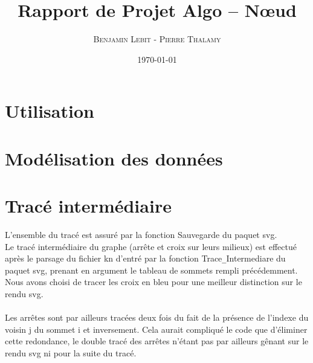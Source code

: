 \documentclass{article}
\title{Rapport de Projet Algo -- Nœud}
\author{\textsc{Benjamin Lebit} - \textsc{Pierre Thalamy}}
\date{\today}
\begin{document}
\maketitle

\section {Utilisation}

\section {Modélisation des données}

\section {Tracé intermédiaire}
L'ensemble du tracé est assuré par la fonction Sauvegarde du paquet svg.
\\
Le tracé intermédiaire du graphe (arrête et croix sur leurs milieux) est effectué après le parsage du fichier kn d'entré par la fonction
Trace\verb+_+Intermediare du paquet svg, prenant en argument le tableau de sommets rempli précédemment. Nous avons choisi de tracer les croix en bleu pour une meilleur distinction sur le rendu svg.\\
\\
Les arrêtes sont par ailleurs tracées deux fois du fait de la présence de l'indexe du voisin j du sommet i et inversement. Cela aurait compliqué le code que d'éliminer cette redondance, le double tracé des arrêtes n'étant pas par ailleurs gênant sur le rendu svg ni pour la suite du tracé.
\end{document}
